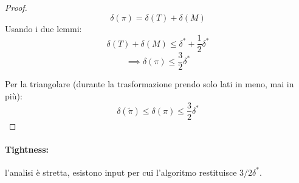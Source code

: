 \begin{proof}
	$$\delta(\pi) = \delta (T) + \delta(M)$$
	Usando i due lemmi:
	$$ \delta (T) + \delta (M) \leq \delta^\ast + \frac{1}{2} \delta^\ast $$
	$$ \implies \delta (\pi) \leq \frac{3}{2} \delta ^\ast $$
	
	Per la triangolare (durante la trasformazione prendo solo lati in meno, mai in più):
	$$ \delta (\tilde \pi) \leq \delta (\pi) \leq \frac{3}{2} \delta^\ast $$
\end{proof}

\paragraph{Tightness:} l'analisi è stretta, esistono input per cui l'algoritmo restituisce $3/2 \delta^\ast$.\\

